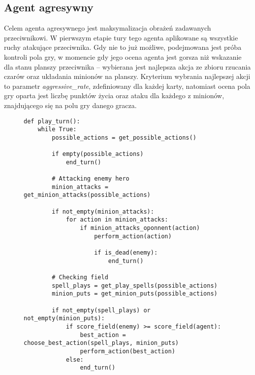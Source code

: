 \subsection{Agent agresywny}

Celem agenta agresywnego jest maksymalizacja obrażeń zadawanych przeciwnikowi. W pierwszym etapie tury tego agenta aplikowane są wszystkie ruchy atakujące przeciwnika. Gdy nie to już możliwe, podejmowana jest próba kontroli pola gry, w momencie gdy jego ocena agenta jest gorsza niż wskazanie dla stanu planszy przeciwnika -- wybierana jest najlepsza akcja ze zbioru rzucania czarów oraz układania minionów na planszy. Kryterium wybrania najlepszej akcji to parametr \emph{aggressive\_rate}, zdefiniowany dla każdej karty, natomiast ocena pola gry oparta jest liczbę punktów życia oraz ataku dla każdego z minionów, znajdującego się na polu gry danego gracza.

\begin{figure}[H]
	\begin{verbatim}
def play_turn():
	while True:
		possible_actions = get_possible_actions()
		
		if empty(possible_actions)
			end_turn()
		
		# Attacking enemy hero
		minion_attacks = get_minion_attacks(possible_actions)
		
		if not_empty(minion_attacks):
			for action in minion_attacks:
				if minion_attacks_oponnent(action)
					perform_action(action)
				
					if is_dead(enemy):
						end_turn()
			
		# Checking field	
		spell_plays = get_play_spells(possible_actions)
		minion_puts = get_minion_puts(possible_actions)
				
		if not_empty(spell_plays) or not_empty(minion_puts):
			if score_field(enemy) >= score_field(agent):
				best_action = choose_best_action(spell_plays, minion_puts)
				perform_action(best_action)
			else:
				end_turn()
	\end{verbatim}
\end{figure}